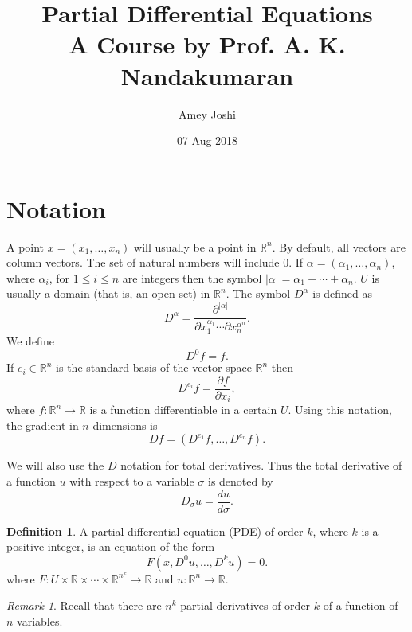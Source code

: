 \documentclass{article}
\newcommand{\td}[2]{\frac{d{#1}}{d{#2}}}
\newcommand{\pd}[2]{\frac{\partial{#1}}{\partial{#2}}}
\theoremstyle{plain}
\numberwithin{thm}{section}
\theoremstyle{plain}
\numberwithin{prop}{section}
\theoremstyle{definition}
\newtheorem{defn}{Definition}
\numberwithin{defn}{section}
\theoremstyle{remark}
\newtheorem*{rem}{Remark}
\numberwithin{equation}{section}
\begin{document}
\title{Partial Differential Equations\\A Course by Prof. A. K. Nandakumaran}
\author{Amey Joshi}
\date{07-Aug-2018}
\maketitle

\section{Notation}\label{s1}
A point $x = (x_1, \ldots, x_n)$ will usually be a point in $\mathbb{R}^n$. By default, all vectors 
are column vectors. The set of natural numbers will include $0$. If $\alpha = (\alpha_1, \ldots, 
\alpha_n)$, where $\alpha_i$, for $1 \le i \le n$ are integers then the symbol $|\alpha| = \alpha_1 + 
\cdots + \alpha_n$. $U$ is usually a domain (that is, an open set) in $\mathbb{R}^n$. The symbol 
$D^\alpha$ is defined as
\begin{equation}\label{s1e1}
D^\alpha = \frac{\partial^{|\alpha|}}{\partial x_1^{\alpha_1}\cdots\partial x_n^{\alpha^n}}.
\end{equation}
We define
\begin{equation}\label{s1e2}
D^0f = f.
\end{equation}
If $e_i \in \mathbb{R}^n$ is the standard basis of the vector space $\mathbb{R}^n$ then
\[
D^{e_i}f = \pd{f}{x_i},
\]
where $f: \mathbb{R}^n \rightarrow \mathbb{R}$ is a function differentiable in a certain $U$. 
Using this notation, the gradient in $n$ dimensions is
\begin{equation}\label{s1e3}
Df = (D^{e_1}f, \ldots, D^{e_n}f).
\end{equation}

We will also use the $D$ notation for total derivatives. Thus the total derivative of a function
$u$ with respect to a variable $\sigma$ is denoted by
\begin{equation}\label{s1e4}
D_\sigma u = \td{u}{\sigma}.
\end{equation}

\begin{defn}\label{s1d1}
A partial differential equation (PDE) of order $k$, where $k$ is a positive integer, is an equation
of the form
\begin{equation}\label{s1e5}
F(x, D^0u, \ldots, D^ku) = 0.
\end{equation}
where $F:U \times \mathbb{R} \times \cdots \times \mathbb{R}^{n^k} \rightarrow \mathbb{R}$ and
$u: \mathbb{R}^n \rightarrow \mathbb{R}$.
\end{defn}
\begin{rem}
Recall that there are $n^k$ partial derivatives of order $k$ of a function of $n$ variables.
\end{rem}
\end{document}
